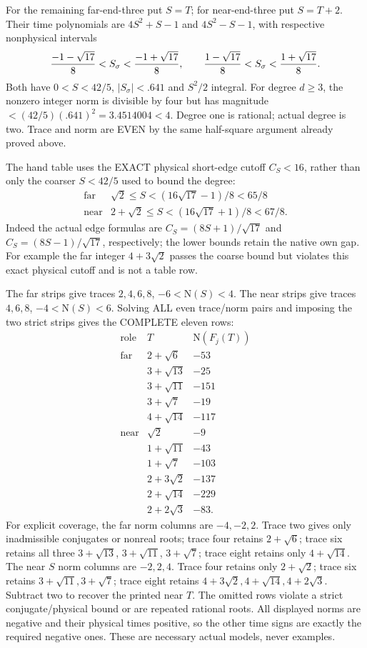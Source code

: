 For the remaining far-end-three put \(S=T\);
for near-end-three put \(S=T+2\).
Their time polynomials are \(4S^2+S-1\) and
\(4S^2-S-1\), with respective nonphysical intervals
\[
 { -1-\sqrt{17}\over8}<S_\sigma<{ -1+\sqrt{17}\over8},
 \qquad
 {1-\sqrt{17}\over8}<S_\sigma<{1+\sqrt{17}\over8}.
\]
Both have \(0<S<42/5\), \(|S_\sigma|<.641\)
and \(S^2/2\) integral.
For degree \(d\ge3\), the nonzero integer norm
is divisible by four but has magnitude
\(<(42/5)(.641)^2=3.4514004<4\).
Degree one is rational; actual degree is two.
Trace and norm are EVEN by the same half-square
argument already proved above.

The hand table uses the EXACT physical short-edge
cutoff \(C_S<16\), rather than only the coarser
\(S<42/5\) used to bound the degree:
\[
\begin{array}{c|c}
 \text{far}&\sqrt2\le S<(16\sqrt{17}-1)/8<65/8\\
 \text{near}&2+\sqrt2\le S<(16\sqrt{17}+1)/8<67/8 .
\end{array}
\]
Indeed the actual edge formulas are
\(C_S=(8S+1)/\sqrt{17}\) and
\(C_S=(8S-1)/\sqrt{17}\), respectively;
the lower bounds retain the native own gap.
For example the far integer \(4+3\sqrt2\)
passes the coarse bound but violates this
exact physical cutoff and is not a table row.

The far strips give traces \(2,4,6,8\),
\(-6<\mathrm N(S)<4\).
The near strips give traces \(4,6,8\),
\(-4<\mathrm N(S)<6\).
Solving ALL even trace/norm pairs and imposing
the two strict strips gives the COMPLETE eleven rows:
\[
\begin{array}{c|c|r}
 \text{role}&T&\mathrm N(F_j(T))\\ \hline
 \text{far}&2+\sqrt6&-53\\
 &3+\sqrt{13}&-25\\
 &3+\sqrt{11}&-151\\
 &3+\sqrt7&-19\\
 &4+\sqrt{14}&-117\\ \hline
 \text{near}&\sqrt2&-9\\
 &1+\sqrt{11}&-43\\
 &1+\sqrt7&-103\\
 &2+3\sqrt2&-137\\
 &2+\sqrt{14}&-229\\
 &2+2\sqrt3&-83 .
\end{array}
\]
For explicit coverage, the far norm columns are
\(-4,-2,2\).
Trace two gives only inadmissible conjugates or
nonreal roots; trace four retains \(2+\sqrt6\);
trace six retains all three \(3+\sqrt{13}\),
\(3+\sqrt{11}\), \(3+\sqrt7\);
trace eight retains only \(4+\sqrt{14}\).
The near \(S\) norm columns are \(-2,2,4\).
Trace four retains only \(2+\sqrt2\);
trace six retains \(3+\sqrt{11},3+\sqrt7\);
trace eight retains \(4+3\sqrt2,4+\sqrt{14},4+2\sqrt3\).
Subtract two to recover the printed near \(T\).
The omitted rows violate a strict conjugate/physical
bound or are repeated rational roots.
All displayed norms are negative and their physical
times positive, so the other time signs are exactly
the required negative ones.
These are necessary actual models, never examples.


